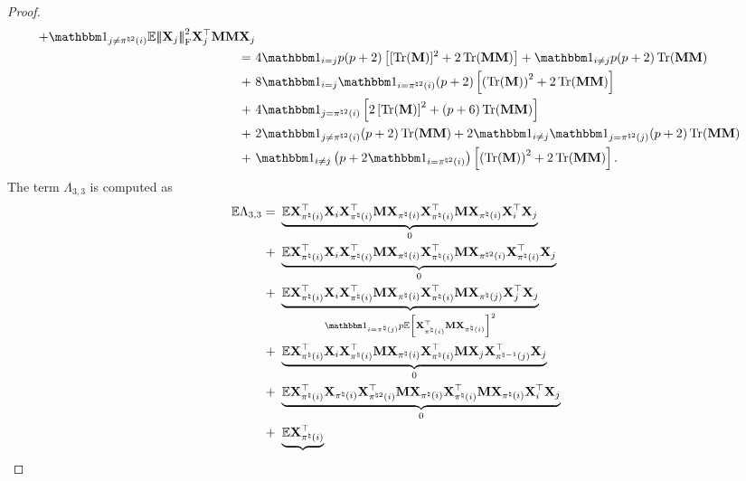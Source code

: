 \documentclass[11pt]{article}
\begin{document}
\begin{proof}
\begin{align}
{+ \Ind_{j \neq \pi^{\natural 2}(i)}
\Expc \Fnorm{\bX_j }^2 \bX_j^{\rmt}\bM \bM \bX_j
} \notag \\
=~&
4\Ind_{i = j}p(p+2)\Bracket{[\trace(\bM)]^2 + 2\trace(\bM\bM)
} + \Ind_{i\neq j} p(p+2)\trace(\bM\bM) \notag \\
+~& 8\Ind_{i = j}\Ind_{i = \pi^{\natural 2}(i)}
(p+2)\Bracket{\bracket{\trace(\bM)}^2 + 2\trace(\bM\bM)}
\notag \\
+~& 4\Ind_{j = \pi^{\natural 2}(i)}
\Bracket{2\Bracket{\trace(\bM)}^2 + (p+6)\trace(\bM\bM)}
\notag \\
+~& 2\Ind_{j\neq \pi^{\natural 2}(i)}(p+2)\trace(\bM\bM)
+ 2\Ind_{i \neq j}\Ind_{j = \pi^{\natural 2}(j)}
(p+2)\trace(\bM\bM)\notag \\
+~&
\Ind_{i\neq j}\bracket{p + 2\Ind_{i = \pi^{\natural 2}(i)}}
\Bracket{\bracket{\trace(\bM)}^2 + 2\trace(\bM\bM)}.
\end{align}
The term $\Lambda_{3, 3}$ is computed as
\begin{align}
\label{eq:xione_square_lambda33_dd_expc}	
\Expc \Lambda_{3,3} =~&
\underbrace{\Expc \bX_{\pi^{\natural}(i)}^{\rmt}
\bX_{i}\bX_{\pi^{\natural}(i)}^{\rmt}
\bM \bX_{\pi^{\natural}(i)} \bX_{\pi^{\natural}(i)}^{\rmt} \bM
\bX_{\pi^{\natural}(i)}\bX_{i}^{\rmt}
\bX_j}_{0} \notag \\
+~&
\underbrace{\Expc \bX_{\pi^{\natural}(i)}^{\rmt}
\bX_{i}\bX_{\pi^{\natural}(i)}^{\rmt}
\bM \bX_{\pi^{\natural}(i)} \bX_{\pi^{\natural}(i)}^{\rmt} \bM
\bX_{\pi^{\natural 2}(i)}\bX_{\pi^{\natural}(i)}^{\rmt}
\bX_j}_{0} \notag \\
+~&
\underbrace{\Expc \bX_{\pi^{\natural}(i)}^{\rmt}
\bX_{i}\bX_{\pi^{\natural}(i)}^{\rmt}
\bM \bX_{\pi^{\natural}(i)} \bX_{\pi^{\natural}(i)}^{\rmt} \bM
\bX_{\pi^{\natural}(j)}\bX_{j}^{\rmt}
\bX_j}_{
\Ind_{i = \pi^{\natural}(j)}p \Expc \Bracket{\bX_{\pi^{\natural}(i)}^{\rmt}\bM \bX_{\pi^{\natural}(i)} }^2
} \notag \\
+~&
\underbrace{\Expc \bX_{\pi^{\natural}(i)}^{\rmt} %
\bX_{i}\bX_{\pi^{\natural}(i)}^{\rmt}
\bM \bX_{\pi^{\natural}(i)} \bX_{\pi^{\natural}(i)}^{\rmt} \bM
\bX_{j}\bX_{\pi^{\natural -1}(j)}^{\rmt}
\bX_j}_{0} \notag \\
+~&
\underbrace{\Expc \bX_{\pi^{\natural}(i)}^{\rmt}
\bX_{\pi^{\natural}(i)}\bX_{\pi^{\natural 2}(i)}^{\rmt}
\bM \bX_{\pi^{\natural}(i)} \bX_{\pi^{\natural}(i)}^{\rmt} \bM
\bX_{\pi^{\natural}(i)}\bX_{i}^{\rmt}
\bX_j}_{0} \notag \\
+~&
\underbrace{\Expc \bX_{\pi^{\natural}(i)}^{\rmt}
}
\end{align}
\end{proof}
\end{document}
